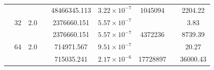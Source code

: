 \begin{table}[htbp]
\begin{tabular}{l S[table-format=3.0] S[table-format=4.1] l S[table-format=3.3] S[table-format=1.2e2] S[table-format=6.0] S[table-format=2.0] S[table-format=4.2]}
     &  &  &  & 48466345.113 & $3.22 \times 10^{-7}$ & 1045094 & {\text{---}} & 2204.22 \\
     & 32 & 2.0 &  & 2376660.151 & $5.57 \times 10^{-7}$ & {\text{---}} & {\text{---}} & 3.83 \\
     &  &  &  & 2376660.151 & $5.57 \times 10^{-7}$ & 4372236 & {\text{---}} & 8739.39 \\
     & 64 & 2.0 &  & 714971.567 & $9.51 \times 10^{-7}$ & {\text{---}} & {\text{---}} & 20.27 \\
     &  &  &  & 715035.241 & $2.17 \times 10^{-6}$ & 17728897 & {\text{---}} & 36000.43 \\
    \bottomrule
  \end{tabular}
\end{table}
